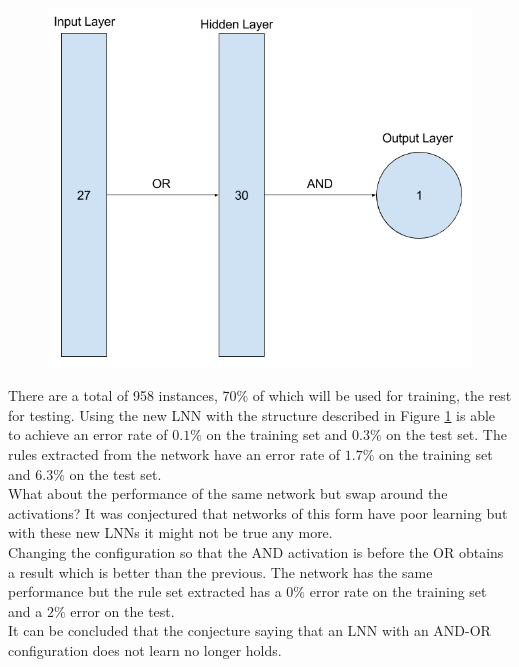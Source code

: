 \begin{figure}[H]
	\centering
	\begin{minipage}[b]{0.5\textwidth}
		\includegraphics[width=\textwidth]{Tic-Tac-Toe-Net.png}
		\caption{}
		\label{fig:tic-tac-toe-net}
	\end{minipage}
	\hfill
\end{figure}

There are a total of 958 instances, 70\% of which will be used for training, the rest for testing. Using the new LNN with the structure described in Figure \ref{fig:tic-tac-toe-net} is able to achieve an error rate of $0.1\%$ on the training set and $0.3\%$ on the test set. The rules extracted from the network have an error rate of $1.7\%$ on the training set and $6.3\%$ on the test set.\\

What about the performance of the same network but swap around the activations? It was conjectured that networks of this form have poor learning \cite{LearningLogicalActivations} but with these new LNNs it might not be true any more.\\

Changing the configuration so that the AND activation is before the OR obtains a result which is better than the previous. The network has the same performance but the rule set extracted has a $0\%$ error rate on the training set and a $2\%$ error on the test.\\

It can be concluded that the conjecture saying that an LNN with an AND-OR configuration does not learn no longer holds.

